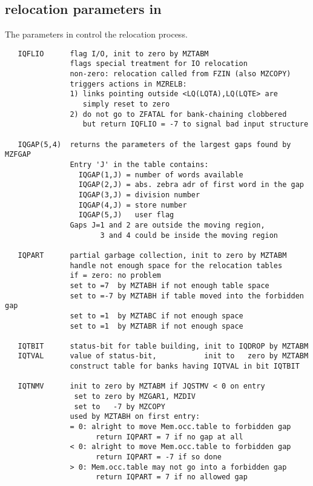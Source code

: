 \subsection*{relocation parameters in }

The parameters in  control the relocation process.

\begin{verbatim}
   IQFLIO      flag I/O, init to zero by MZTABM
               flags special treatment for IO relocation
               non-zero: relocation called from FZIN (also MZCOPY)
               triggers actions in MZRELB:
               1) links pointing outside <LQ(LQTA),LQ(LQTE> are
                  simply reset to zero
               2) do not go to ZFATAL for bank-chaining clobbered
                  but return IQFLIO = -7 to signal bad input structure

   IQGAP(5,4)  returns the parameters of the largest gaps found by MZFGAP
               Entry 'J' in the table contains:
                 IQGAP(1,J) = number of words available
                 IQGAP(2,J) = abs. zebra adr of first word in the gap
                 IQGAP(3,J) = division number
                 IQGAP(4,J) = store number
                 IQGAP(5,J)   user flag
               Gaps J=1 and 2 are outside the moving region,
                      3 and 4 could be inside the moving region

   IQPART      partial garbage collection, init to zero by MZTABM
               handle not enough space for the relocation tables
               if = zero: no problem
               set to =7  by MZTABH if not enough table space
               set to =-7 by MZTABH if table moved into the forbidden gap
               set to =1  by MZTABC if not enough space
               set to =1  by MZTABR if not enough space

   IQTBIT      status-bit for table building, init to IQDROP by MZTABM
   IQTVAL      value of status-bit,           init to   zero by MZTABM
               construct table for banks having IQTVAL in bit IQTBIT

   IQTNMV      init to zero by MZTABM if JQSTMV < 0 on entry
                set to zero by MZGAR1, MZDIV
                set to   -7 by MZCOPY
               used by MZTABH on first entry:
               = 0: alright to move Mem.occ.table to forbidden gap
                     return IQPART = 7 if no gap at all
               < 0: alright to move Mem.occ.table to forbidden gap
                     return IQPART = -7 if so done
               > 0: Mem.occ.table may not go into a forbidden gap
                     return IQPART = 7 if no allowed gap


\end{verbatim}
